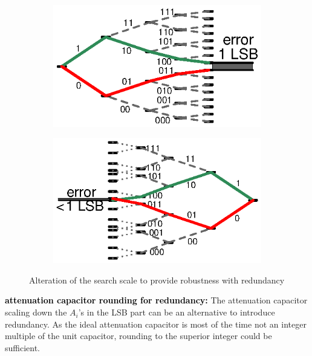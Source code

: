 \begin{figure}[htp]
	\centering
	\begin{subfigure}[b]{0.48\textwidth}
		\includegraphics[width=\textwidth]{Chapter4/Figs/sar-binary-scale.ps}
		\label{fig:std-scale}
	\end{subfigure}
	\begin{subfigure}[b]{0.48\textwidth}
		\includegraphics[width=\textwidth]{Chapter4/Figs/sar-non-binary-scale.ps}
		\label{fig:altered-scale-1}
	\end{subfigure}
	\caption{Alteration of the search scale to provide robustness with redundancy}
	\label{fig:sar-redundancy}
\end{figure}

\textbf{\textcolor{black}{attenuation capacitor rounding for redundancy:}}
The attenuation capacitor scaling down the \(A_i\)'s in the LSB part can be an alternative to introduce redundancy. As the ideal attenuation capacitor is most of the time not an integer multiple of the unit capacitor, rounding to the superior integer could be sufficient.

